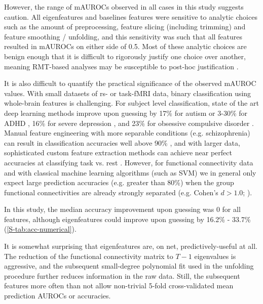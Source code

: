 \documentclass[12pt]{spieman}  %
\begin{document}
\begin{spacing}{2}
However, the range of mAUROCs observed in all cases in this study suggests
caution. All eigenfeatures and baselines features were sensitive to analytic
choices such as the amount of preprocessing, feature slicing (including trimming) and
feature smoothing / unfolding, and this sensitivity was such that all features
resulted in mAUROCs on either side of 0.5. Most of these analytic choices are benign enough that
it is difficult to rigorously justify one choice over another, meaning RMT-based
analyses may be susceptible to post-hoc justification \cite{kerrHARKingHypothesizingResults1998}.

It is also difficult to quantify the practical significance of the observed mAUROC values.
With small datasets of rs- or task-fMRI data, binary classification using whole-brain
features is challenging. For subject level classification, state of the art deep learning methods
improve upon guessing by 17\% for autism \cite{bengs4DSpatioTemporalDeep2020} or 3-30\% for ADHD
\cite{riazDeepFMRIEndtoendDeep2020}, 16\% for severe depression
\cite{ramasubbuAccuracyAutomatedClassification2016}, and 23\% for obsessive compulsive disorder
\cite{takagiNeuralMarkerObsessiveCompulsive2017}. Manual feature engineering with more separable
conditions (e.g. schizophrenia) can result in classification accuracies well above 90\%
\cite{duHighClassificationAccuracy2012}, and with larger data, sophisticated custom feature
extraction methods can achieve near perfect accuracies at classifying task vs. rest
\cite{zhangCharacterizingDifferentiatingTaskbased2016}. However, for functional connectivity data
and with classical machine learning algorithms (such as SVM) we in general only expect large
prediction accuracies (e.g. greater than 80\%) when the group functional connectivities are already
strongly separated (e.g. Cohen’s \(d > 1.0\); ).

In this study, the median accuracy improvement upon guessing was 0 for all features, although
eigenfeatures could improve upon guessing by 16.2\% - 33.7\% (\ref{S-tab:acc-numerical}).

It is somewhat surprising that eigenfeatures are, on net, predictively-useful
at all. The reduction of the functional connectivity matrix to \(T - 1\)
eigenvalues is aggressive, and the subsequent small-degree polynomial fit used
in the unfolding procedure further reduces information in the raw data.
Still, the subsequent features more often than not allow non-trivial 5-fold
cross-validated mean prediction AUROCs or accuracies.


\end{spacing}
\end{document}
